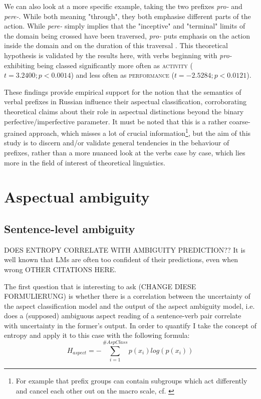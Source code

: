 We can also look at a more specific example, taking the two prefixes \emph{pro-} and \emph{pere-}. While both meaning "through", they both emphasise different parts of the action. While \emph{pere-} simply implies that the "inceptive" and "terminal" limits of the domain being crossed have been traversed, \emph{pro-} puts emphasis on the action inside the domain and on the duration of this traversal \citep{0a0c5a60-a736-3226-b927-03ba8af4fd75}. This theoretical hypothesis is validated by the results here, with verbs beginning with \emph{pro-} exhibiting being classed significantly more often as \textsc{activity} ($t=3.2400; p<0.0014$) and less often as \textsc{performance} ($t=-2.5284; p<0.0121$).

These findings provide empirical support for the notion that the semantics of verbal prefixes in Russian influence their aspectual classification, corroborating theoretical claims about their role in aspectual distinctions beyond the binary perfective/imperfective parameter. It must be noted that this is a rather coarse-grained approach, which misses a lot of crucial information\footnote{For example that prefix groups can contain subgroups which act differently and cancel each other out on the macro scale, cf. \citet{Janssen2012ADO}}, but the aim of this study is to discern and/or validate general tendencies in the behaviour of prefixes, rather than a more nuanced look at the verbs case by case, which lies more in the field of interest of theoretical linguistics.

\section{Aspectual ambiguity}
\subsection{Sentence-level ambiguity}
DOES ENTROPY CORRELATE WITH AMBIGUITY PREDICTION??
It is well known that LMs are often too confident of their predictions, even when wrong \citep{friedrich-etal-2023-kind, } OTHER CITATIONS HERE.

The first question that is interesting to ask (CHANGE DIESE FORMULIERUNG) is whether there is a correlation between the uncertainty of the aspect classification model and the output of the aspect ambiguity model, i.e. does a (supposed) ambiguous aspect reading of a sentence-verb pair correlate with uncertainty in the former's output. In order to quantify I take the concept of entropy and apply it to this case with the following formula:
\begin{equation} \label{equation:aspect_entropy}
    H_{aspect} = - \sum_{i=1}^{\#AspClass}p(x_i)log(p(x_i))
\end{equation}

